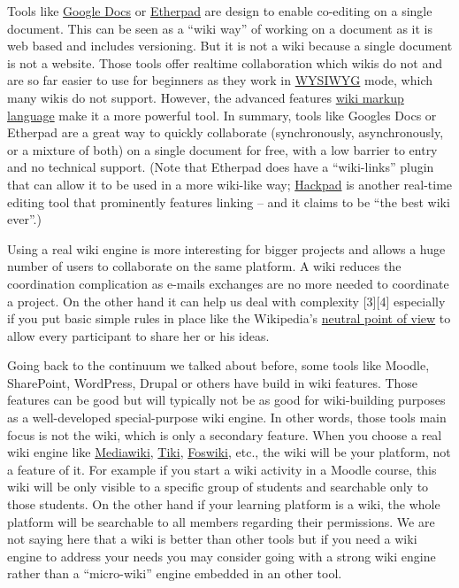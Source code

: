 Tools like \href{https://docs.google.com/}{Google Docs} or
\href{http://en.wikipedia.org/wiki/Etherpad}{Etherpad} are design to
enable co-editing on a single document. This can be seen as a ``wiki
way'' of working on a document as it is web based and includes
versioning. But it is not a wiki because a single document is not a
website. Those tools offer realtime collaboration which wikis do not and
are so far easier to use for beginners as they work in
\href{http://en.wikipedia.org/wiki/WYSIWYG}{WYSIWYG} mode, which many
wikis do not support. However, the advanced features
\href{http://en.wikipedia.org/wiki/Wiki\_syntax}{wiki markup language}
make it a more powerful tool. In summary, tools like Googles Docs or
Etherpad are a great way to quickly collaborate (synchronously,
asynchronously, or a mixture of both) on a single document for free,
with a low barrier to entry and no technical support. (Note that
Etherpad does have a ``wiki-links'' plugin that can allow it to be used
in a more wiki-like way; \href{https://hackpad.com/}{Hackpad} is another
real-time editing tool that prominently features linking -- and it
claims to be ``the best wiki ever''.)

Using a real wiki engine is more interesting for bigger projects and
allows a huge number of users to collaborate on the same platform. A
wiki reduces the coordination complication as e-mails exchanges are no
more needed to coordinate a project. On the other hand it can help us
deal with complexity {[}3{]}{[}4{]} especially if you put basic simple
rules in place like the Wikipedia's
\href{http://en.wikipedia.org/wiki/NPOV}{neutral point of view} to allow
every participant to share her or his ideas.

Going back to the continuum we talked about before, some tools like
Moodle, SharePoint, WordPress, Drupal or others have build in wiki
features. Those features can be good but will typically not be as good
for wiki-building purposes as a well-developed special-purpose wiki
engine. In other words, those tools main focus is not the wiki, which is
only a secondary feature. When you choose a real wiki engine like
\href{http://www.mediawiki.org/}{Mediawiki},
\href{http://www.tiki.org/}{Tiki}, \href{http://foswiki.org/}{Foswiki},
etc., the wiki will be your platform, not a feature of it. For example
if you start a wiki activity in a Moodle course, this wiki will be only
visible to a specific group of students and searchable only to those
students. On the other hand if your learning platform is a wiki, the
whole platform will be searchable to all members regarding their
permissions. We are not saying here that a wiki is better than other
tools but if you need a wiki engine to address your needs you may
consider going with a strong wiki engine rather than a ``micro-wiki''
engine embedded in an other tool.

